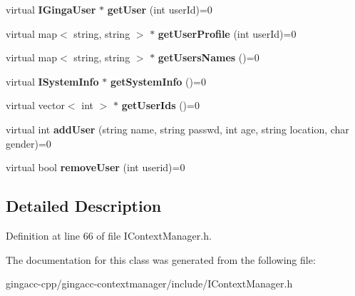 \begin{CompactItemize}
\item 
virtual {\bf IGingaUser} $\ast$ \textbf{getUser} (int userId)=0\label{classbr_1_1pucrio_1_1telemidia_1_1ginga_1_1core_1_1contextmanager_1_1IContextManager_a7efd3215870a4cc5ae3d16da558278d}

\item 
virtual map$<$ string, string $>$ $\ast$ \textbf{getUserProfile} (int userId)=0\label{classbr_1_1pucrio_1_1telemidia_1_1ginga_1_1core_1_1contextmanager_1_1IContextManager_170dd167eeca5409419cbff7ef978dd5}

\item 
virtual map$<$ string, string $>$ $\ast$ \textbf{getUsersNames} ()=0\label{classbr_1_1pucrio_1_1telemidia_1_1ginga_1_1core_1_1contextmanager_1_1IContextManager_768e2263103d054eb2288876941d258c}

\item 
virtual {\bf ISystemInfo} $\ast$ \textbf{getSystemInfo} ()=0\label{classbr_1_1pucrio_1_1telemidia_1_1ginga_1_1core_1_1contextmanager_1_1IContextManager_b082edea53454ab101f6be7e3914adef}

\item 
virtual vector$<$ int $>$ $\ast$ \textbf{getUserIds} ()=0\label{classbr_1_1pucrio_1_1telemidia_1_1ginga_1_1core_1_1contextmanager_1_1IContextManager_4c097e2f964f6776362c014857124cd6}

\item 
virtual int \textbf{addUser} (string name, string passwd, int age, string location, char gender)=0\label{classbr_1_1pucrio_1_1telemidia_1_1ginga_1_1core_1_1contextmanager_1_1IContextManager_68afcf7c03e9831500bbe4c811a33d63}

\item 
virtual bool \textbf{removeUser} (int userid)=0\label{classbr_1_1pucrio_1_1telemidia_1_1ginga_1_1core_1_1contextmanager_1_1IContextManager_ce475df4a38c169241b728988598820b}

\end{CompactItemize}


\subsection{Detailed Description}




Definition at line 66 of file IContextManager.h.

The documentation for this class was generated from the following file:\begin{CompactItemize}
\item 
gingacc-cpp/gingacc-contextmanager/include/IContextManager.h\end{CompactItemize}

